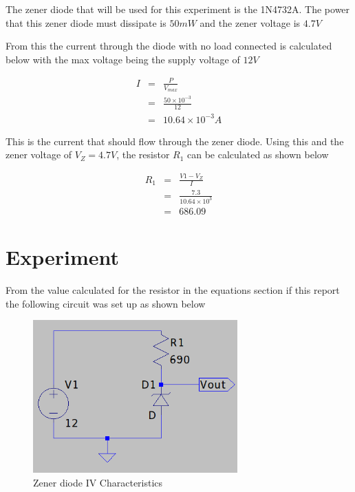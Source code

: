 \documentclass[12pt, a4paper]{article}
\begin{document}
		The zener diode that will be used for this experiment is the 1N4732A. The power that this zener diode must dissipate is $50mW$ and the zener voltage is $4.7V$

		From this the current through the diode with no load connected is calculated below with the max voltage being the supply voltage of $12V$

		\begin{equation}
			\begin{array}{rcl}
				I & = & \frac{P}{V_{max}}\\
				& = & \frac{50\times10^{-3}}{12}\\
				& = & 10.64 \times 10^{-3}A
			\end{array}
		  	
		\end{equation}  

		This is the current that should flow through the zener diode. Using this and the zener voltage of $V_Z = 4.7V$, the resistor $R_1$ can be calculated as shown below

		\begin{equation}
			\begin{array}{rcl}
				R_1 & = & \frac{V1 - V_Z}{I}\\
				& = & \frac{7.3}{10.64\times10^{3}}\\
				& = & 686.09
			\end{array}
		  	
		\end{equation}  

	\section{Experiment} %
	\label{sec:experiment}
		From the value calculated for the resistor in the equations section if this report the following circuit was set up as shown below

		\begin{figure}[H]
			\centering
			\includegraphics[width=0.7\textwidth]{Images/Part_1_Experiment.png}
			\caption{Zener diode IV Characteristics}
			\label{fig:part_1_experiment}
		\end{figure}
\end{document}
